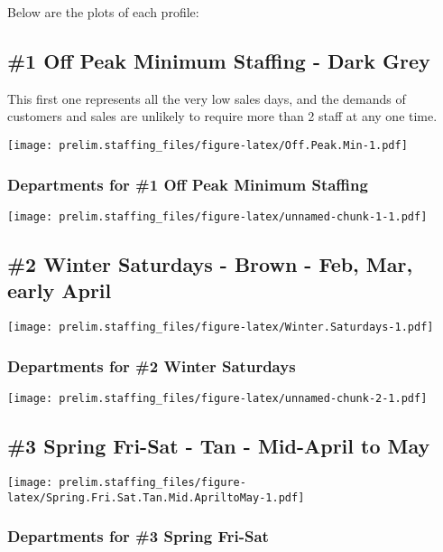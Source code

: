 \documentclass[]{article}
\begin{document}
Below are the plots of each profile:

\newpage

\subsection{\#1 Off Peak Minimum Staffing - Dark
Grey}\label{off-peak-minimum-staffing---dark-grey}

This first one represents all the very low sales days, and the demands
of customers and sales are unlikely to require more than 2 staff at any
one time.

\texttt{[image: prelim.staffing\_files/figure-latex/Off.Peak.Min-1.pdf]}

\subsubsection{Departments for \#1 Off Peak Minimum
Staffing}\label{departments-for-1-off-peak-minimum-staffing}

\texttt{[image: prelim.staffing\_files/figure-latex/unnamed-chunk-1-1.pdf]}

\subsection{\#2 Winter Saturdays - Brown - Feb, Mar, early
April}\label{winter-saturdays---brown---feb-mar-early-april}

\texttt{[image: prelim.staffing\_files/figure-latex/Winter.Saturdays-1.pdf]}

\subsubsection{Departments for \#2 Winter
Saturdays}\label{departments-for-2-winter-saturdays}

\texttt{[image: prelim.staffing\_files/figure-latex/unnamed-chunk-2-1.pdf]}

\subsection{\#3 Spring Fri-Sat - Tan - Mid-April to
May}\label{spring-fri-sat---tan---mid-april-to-may}

\texttt{[image: prelim.staffing\_files/figure-latex/Spring.Fri.Sat.Tan.Mid.ApriltoMay-1.pdf]}

\subsubsection{Departments for \#3 Spring
Fri-Sat}\label{departments-for-3-spring-fri-sat}
\end{document}
